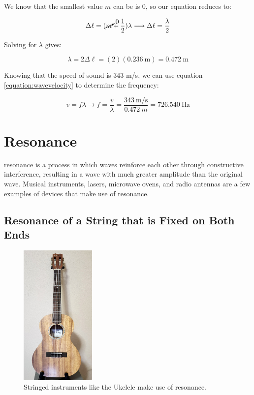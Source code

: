 \begin{mdframed}[backgroundcolor=blue!10!white]
		We know that the smallest value $m$ can be is 0, so our equation reduces to:
				
		\begin{equation*}
		\Delta \ell = (\cancelto{0}{m}+\frac{1}{2}) \lambda \longrightarrow \Delta \ell = \frac{\lambda}{2}
		\end{equation*}
		
		


		Solving for $\lambda$ gives:
		
		
		\begin{equation*}
		\lambda = 2 \Delta \ell = (2)(\SI{0.236}{\m}) = \SI{0.472}{\m}
		\end{equation*}
		
	
		Knowing that the speed of sound is 343 m/s, we can use equation \ref{equation:wavevelocity} to determine the frequency:
		
		\begin{equation*}
		v = f \lambda \longrightarrow f = \frac{v}{\lambda} = \frac{\SI[per-mode = symbol]{343}{\m\per\s}}{\SI{0.472}{m}} = \boxed{\SI{726.540}{\Hz}} 
		\end{equation*}
		

		 
	
		
	\end{mdframed}
	
	
	\section{Resonance}
	\gls{resonance} is a process in which waves reinforce each other through constructive interference, resulting in a wave with much greater amplitude than the original wave.   Musical instruments, lasers, microwave ovens, and radio antennas are a few examples of devices that make use of resonance. 
	
		\subsection{Resonance of a String that is Fixed on Both Ends}
		
		\begin{figure}[h!]
			\begin{center}
			\includegraphics[height=2.75in]{Chapters/Ch10-Waves/ukelele.jpg}			
			\caption{Stringed instruments like the Ukelele make use of resonance.}
			\label{fig:ukelele}
		\end{center}
\end{figure}
	
